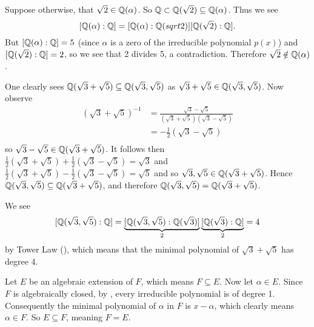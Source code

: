 \begin{questions}
\begin{partquestions}{\alph*}
\begin{partquestions}{\roman*}
            \item Suppose otherwise, that $\sqrt2 \in \mathbb{Q}(\alpha)$. So $\mathbb{Q} \subset \mathbb{Q}(\sqrt2) \subseteq \mathbb{Q}(\alpha)$. Thus we see
            \[
                [\mathbb{Q}(\alpha): \mathbb{Q}] = [\mathbb{Q}(\alpha):\mathbb{Q}(sqrt2)][\mathbb{Q}(\sqrt2):\mathbb{Q}].
            \]
            But $[\mathbb{Q}(\alpha): \mathbb{Q}] = 5$ (since $\alpha$ is a zero of the irreducible polynomial $p(x)$) and $[\mathbb{Q}(\sqrt2):\mathbb{Q}] = 2$, so we see that 2 divides 5, a contradiction. Therefore $\sqrt2 \notin \mathbb{Q}(\alpha)$.
        \end{partquestions}
    \end{partquestions}

    \item \begin{partquestions}{\roman*}
        \item One clearly sees $\mathbb{Q}(\sqrt3 + \sqrt5) \subseteq \mathbb{Q}(\sqrt3, \sqrt5)$ as $\sqrt3 + \sqrt5 \in \mathbb{Q}(\sqrt3, \sqrt5)$. Now observe
        \begin{align*}
            \left(\sqrt3+\sqrt5\right)^{-1} &= \frac{\sqrt3-\sqrt5}{\left(\sqrt3+\sqrt5\right)\left(\sqrt3-\sqrt5\right)}\\
            &= -\frac12\left(\sqrt3-\sqrt5\right)\\
        \end{align*}
        so $\sqrt3-\sqrt5 \in \mathbb{Q}(\sqrt3 + \sqrt5)$. It follows then $\frac12\left(\sqrt3 + \sqrt5\right) + \frac12\left(\sqrt3 - \sqrt5\right) = \sqrt3$ and $\frac12\left(\sqrt3 + \sqrt5\right) - \frac12\left(\sqrt3 - \sqrt5\right) = \sqrt5$ and so $\sqrt3,\sqrt5\in\mathbb{Q}(\sqrt3+\sqrt5)$. Hence $\mathbb{Q}(\sqrt3,\sqrt5)\subseteq\mathbb{Q}(\sqrt3+\sqrt5)$, and therefore $\mathbb{Q}(\sqrt3, \sqrt5) = \mathbb{Q}(\sqrt3 + \sqrt5)$.

        \item We see
        \[
            [\mathbb{Q}(\sqrt3, \sqrt5): \mathbb{Q}] = \underbrace{[\mathbb{Q}(\sqrt3, \sqrt5): \mathbb{Q}(\sqrt3)]}_2\underbrace{[\mathbb{Q}(\sqrt3):\mathbb{Q}]}_2 = 4
        \]
        by Tower Law (), which means that the minimal polynomial of $\sqrt3+\sqrt5$ has degree 4.
    \end{partquestions}

    \item Let $E$ be an algebraic extension of $F$, which means $F \subseteq E$. Now let $\alpha \in E$. Since $F$ is algebraically closed, by , every irreducible polynomial is of degree 1. Consequently the minimal polynomial of $\alpha$ in $F$ is $x - \alpha$, which clearly means $\alpha \in F$. So $E \subseteq F$, meaning $F = E$.
\end{questions}

